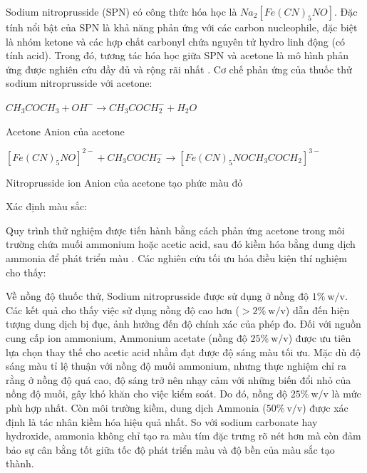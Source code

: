 \documentclass{article} %
\begin{document}
Sodium nitroprusside (SPN) có công thức hóa học là $Na_2[Fe(CN)_5NO]$.
Đặc tính nổi bật của SPN là khả năng phản ứng với các carbon nucleophile, đặc biệt là nhóm ketone và các hợp chất carbonyl chứa nguyên tử hydro linh động (có tính acid). Trong đó, tương tác hóa học giữa SPN và acetone là mô hình phản ứng được nghiên cứu đầy đủ và rộng rãi nhất \cite{16}. Cơ chế phản ứng của thuốc thử sodium nitroprusside với acetone:

\begin{center}
    $CH_3COCH_3 + OH^- \rightarrow CH_3COCH_2^- + H_2O$
\end{center}

\hspace{3cm} Acetone \hspace{1.75cm} Anion của acetone

\begin{center}
    $[Fe(CN)_5NO]^{2-} + CH_3COCH_2^- \rightarrow [Fe(CN)_5NOCH_3COCH_2]^{3-}$
\end{center}

\hspace{0.25cm} Nitroprusside ion \hspace{0.25cm} Anion của acetone \hspace{0.25cm} tạo phức màu đỏ

Xác định màu sắc:

Quy trình thử nghiệm được tiến hành bằng cách phản ứng acetone trong môi trường chứa muối ammonium hoặc acetic acid, sau đó kiềm hóa bằng dung dịch ammonia để phát triển màu \cite{17}. Các nghiên cứu tối ưu hóa điều kiện thí nghiệm cho thấy:

Về nồng độ thuốc thử, Sodium nitroprusside được sử dụng ở nồng độ $1\%\ \text{w/v}$. Các kết quả cho thấy việc sử dụng nồng độ cao hơn ($> 2\%\ \text{w/v}$) dẫn đến hiện tượng dung dịch bị đục, ảnh hưởng đến độ chính xác của phép đo. Đối với nguồn cung cấp ion ammonium, Ammonium acetate (nồng độ $25\%\ \text{w/v}$) được ưu tiên lựa chọn thay thế cho acetic acid nhằm đạt được độ sáng màu tối ưu. Mặc dù độ sáng màu tỉ lệ thuận với nồng độ muối ammonium, nhưng thực nghiệm chỉ ra rằng ở nồng độ quá cao, độ sáng trở nên nhạy cảm với những biến đổi nhỏ của nồng độ muối, gây khó khăn cho việc kiểm soát. Do đó, nồng độ $25\%\ \text{w/v}$ là mức phù hợp nhất. Còn môi trường kiềm, dung dịch Ammonia ($50\%\ \text{v/v}$) được xác định là tác nhân kiềm hóa hiệu quả nhất. So với sodium carbonate hay hydroxide, ammonia không chỉ tạo ra màu tím đặc trưng rõ nét hơn mà còn đảm bảo sự cân bằng tốt giữa tốc độ phát triển màu và độ bền của màu sắc tạo thành.
\end{document}
